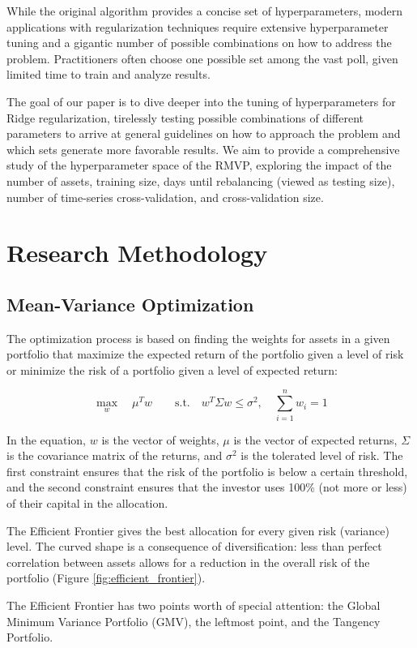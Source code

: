 \documentclass{article}
\begin{document}
While the original algorithm provides a concise set of hyperparameters, modern applications with regularization techniques require extensive hyperparameter tuning and a gigantic number of possible combinations on how to address the problem. Practitioners often choose one possible set among the vast poll, given limited time to train and analyze results.

The goal of our paper is to dive deeper into the tuning of hyperparameters for Ridge regularization, tirelessly testing possible combinations of different parameters to arrive at general guidelines on how to approach the problem and which sets generate more favorable results. We aim to provide a comprehensive study of the hyperparameter space of the RMVP, exploring the impact of the number of assets, training size, days until rebalancing (viewed as testing size), number of time-series cross-validation, and cross-validation size.

\FloatBarrier
\section{Research Methodology}
\FloatBarrier
\subsection{Mean-Variance Optimization}
The optimization process is based on finding the weights for assets in a given portfolio that maximize the expected return of the portfolio given a level of risk or minimize the risk of a portfolio given a level of expected return:

$$
\max_{w} \quad \mu^{T} w \quad \quad
\text{s.t.} \quad w^{T} \Sigma w \leq \sigma^{2}, \quad
\sum_{i=1}^{n} w_{i} = 1
$$

In the equation, $w$ is the vector of weights, $\mu$ is the vector of expected returns, $\Sigma$ is the covariance matrix of the returns, and $\sigma^{2}$ is the tolerated level of risk. The first constraint ensures that the risk of the portfolio is below a certain threshold, and the second constraint ensures that the investor uses 100\% (not more or less) of their capital in the allocation.

The Efficient Frontier gives the best allocation for every given risk (variance) level. The curved shape is a consequence of diversification: less than perfect correlation between assets allows for a reduction in the overall risk of the portfolio (Figure \ref{fig:efficient_frontier}).

The Efficient Frontier has two points worth of special attention: the Global Minimum Variance Portfolio (GMV), the leftmost point, and the Tangency Portfolio.
\end{document}
